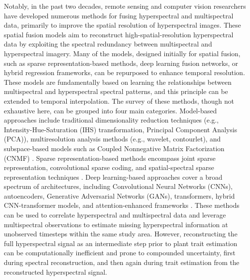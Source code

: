 \documentclass[pdflatex,sn-mathphys-num]{sn-jnl}%
\theoremstyle{thmstyleone}%
\theoremstyle{thmstyletwo}%
\theoremstyle{thmstylethree}%
\begin{document}
Notably, in the past two decades, remote sensing and computer vision researchers have developed numerous methods for fusing hyperspectral and multispectral data, primarily to improve the spatial resolution \cite{yokoya2017hyperspectral} of hyperspectral images. These spatial fusion models aim to reconstruct high-spatial-resolution hyperspectral data by exploiting the spectral redundancy between multispectral and hyperspectral imagery. Many of the models, designed initially for spatial fusion, such as sparse representation-based methods, deep learning fusion networks, or hybrid regression frameworks, can be repurposed to enhance temporal resolution. These models are fundamentally based on learning the relationships between multispectral and hyperspectral spectral patterns, and this principle can be extended to temporal interpolation. The survey of these methods, though not exhaustive here, can be grouped into four main categories. Model-based approaches include traditional dimensionality reduction techniques (e.g., Intensity-Hue-Saturation (IHS) transformation, Principal Component Analysis (PCA)), multiresolution analysis methods (e.g., wavelet, contourlet), and subspace-based models such as Coupled Nonnegative Matrix Factorization (CNMF) \cite{yokoya2017hyperspectral}. Sparse representation-based methods encompass joint sparse representation, convolutional sparse coding, and spatial-spectral sparse representation techniques \cite{xing2022fusion,dian2019multispectral}. Deep learning-based approaches cover a broad spectrum of architectures, including Convolutional Neural Networks (CNNs), autoencoders, Generative Adversarial Networks (GANs), transformers, hybrid CNN-transformer models, and attention-enhanced frameworks \cite{khader2022model,gao2023enhanced,jia2023multiscale,hong2021interpretable}. These methods can be used to correlate hyperspectral and multispectral data and leverage multispectral observations to estimate missing hyperspectral information at unobserved timesteps within the same study area. However, reconstructing the full hyperspectral signal as an intermediate step prior to plant trait estimation can be computationally inefficient and prone to compounded uncertainty, first during spectral reconstruction, and then again during trait estimation from the reconstructed hyperspectral signal.
\end{document}

